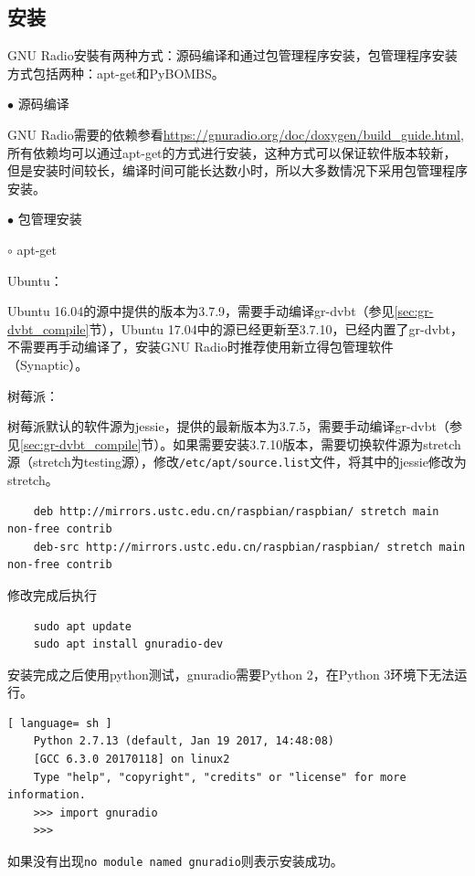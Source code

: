 		\subsection{安装}
			\par GNU Radio安裝有两种方式：源码编译和通过包管理程序安装，包管理程序安装方式包括两种：apt-get和PyBOMBS。
			\par\noindent $\bullet$ 源码编译
			\par GNU Radio需要的依赖参看\href{https://gnuradio.org/doc/doxygen/build\_guide.html}{https://gnuradio.org/doc/doxygen/build\_guide.html},所有依赖均可以通过apt-get的方式进行安装，这种方式可以保证软件版本较新，但是安装时间较长，编译时间可能长达数小时，所以大多数情况下采用包管理程序安装。
			\par\noindent $\bullet$ 包管理安装
			\par\noindent \qquad$\circ$ apt-get
			\par Ubuntu：
			\par Ubuntu 16.04的源中提供的版本为3.7.9，需要手动编译gr-dvbt（参见\ref{sec:gr-dvbt_compile}节），Ubuntu 17.04中的源已经更新至3.7.10，已经内置了gr-dvbt，不需要再手动编译了，安装GNU Radio时推荐使用新立得包管理软件（Synaptic）。
			\par 树莓派：
			\par 树莓派默认的软件源为jessie，提供的最新版本为3.7.5，需要手动编译gr-dvbt（参见\ref{sec:gr-dvbt_compile}节）。如果需要安装3.7.10版本，需要切换软件源为stretch源（stretch为testing源），修改\lstinline[language=sh]{/etc/apt/source.list}文件，将其中的jessie修改为stretch。
			\begin{lstlisting}
	deb http://mirrors.ustc.edu.cn/raspbian/raspbian/ stretch main non-free contrib 
	deb-src http://mirrors.ustc.edu.cn/raspbian/raspbian/ stretch main non-free contrib
			\end{lstlisting}
			\par 修改完成后执行
			\begin{lstlisting}
	sudo apt update
	sudo apt install gnuradio-dev
			\end{lstlisting}
			\par 安装完成之后使用python测试，gnuradio需要Python 2，在Python 3环境下无法运行。
			\begin{lstlisting}[ language= sh ]
	Python 2.7.13 (default, Jan 19 2017, 14:48:08)
	[GCC 6.3.0 20170118] on linux2
	Type "help", "copyright", "credits" or "license" for more information.
	>>> import gnuradio
	>>>
			\end{lstlisting}
			\par 如果没有出现\lstinline[language=sh]{no module named gnuradio}则表示安装成功。
